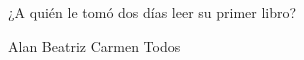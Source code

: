 ¿A quién le tom\'o dos d\'ias leer su primer libro?

\begin{oneparchoices}
    \choice Alan
    \choice Beatriz
    \CorrectChoice Carmen
    \choice Todos
\end{oneparchoices}
